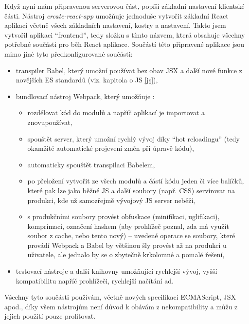     Když nyní mám připravenou serverovou část, popíši základní nastavení klientské části. Nástroj \textit{create-react-app} umožňuje jednoduše vytvořit základní React aplikaci včetně všech základních nastavení, kostry a nastavení. Takto jsem vytvořil aplikaci \enquote{frontend}, tedy složku s tímto názvem, která obsahuje všechny potřebné součásti pro běh React aplikace. Součástí této připravené aplikace jsou mimo jiné tyto předkonfigurované součásti:
    \begin{itemize}
        \item transpiler Babel, který umožní používat bez obav JSX a další nové funkce z novějších ES standardů (viz. kapitola o JS \ref{js}),
        \item bundlovací nástroj Webpack, který umožňuje \cite{webpack-ackee}:
            \begin{itemize}
                \item rozdělovat kód do modulů a napříč aplikací je importovat a znovupoužívat,
                \item spouštět server, který umožní rychlý vývoj díky \enquote{hot reloadingu} (tedy okamžité automatické projevení změn při úpravě kódu),
                \item automaticky spouštět transpilaci Babelem,
                \item po přeložení vytvořit ze všech modulů a částí kódu jeden či více balíčků, které pak lze jako běžné JS a další soubory (např. CSS) servírovat na produkci, kde už samozřejmě vývojový JS server neběží,
                \item s produkčními soubory provést obfuskace (minifikaci, uglifikaci), komprimaci, označení hashem (aby prohlížeč poznal, zda má využít soubor z cache, nebo tento nový) -- uvedené operace se soubory, které provádí Webpack a Babel by většinou šly provést až na produkci u uživatele, ale jednalo by se o zbytečně krkolomné a pomalé řešení,
            \end{itemize}
        \item testovací nástroje a další knihovny umožňující rychlejší vývoj, vyšší kompatibilitu napříč prohlížeči, rychlejší načítání ad.
    \end{itemize}
    Všechny tyto součásti používám, včetně nových specifikací ECMAScript, JSX apod., díky všem nástrojům není důvod k obávám z nekompatibility a můžu z jejich použití pouze profitovat.
    
